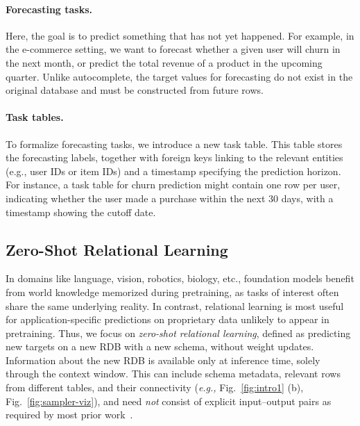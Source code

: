 \paragraph{Forecasting tasks.} Here, the goal is to predict something that has not yet happened. For example, in the e-commerce setting, we want to forecast whether a given user will churn in the next month, or predict the total revenue of a product in the upcoming quarter. Unlike autocomplete, the target values for forecasting do not exist in the original database and must be constructed from future rows.

\paragraph{Task tables.} To formalize forecasting tasks, we introduce a new task table. This table stores the forecasting labels, together with foreign keys linking to the relevant entities (e.g., user IDs or item IDs) and a timestamp specifying the prediction horizon. For instance, a task table for churn prediction might contain one row per user, indicating whether the user made a purchase within the next 30 days, with a timestamp showing the cutoff date. 




\subsection{Zero-Shot Relational Learning}


In domains like language, vision, robotics, biology, etc.,
foundation models benefit from world knowledge memorized during pretraining,
as tasks of interest often share the same underlying reality.
In contrast,
relational learning is most useful for
application-specific predictions on proprietary data
unlikely to appear in pretraining.
Thus, we focus on \textit{zero-shot relational learning},
defined as predicting new targets on a new RDB with a new schema,
without weight updates.
Information about the new RDB is available
only at inference time,
solely through the context window.
This can include schema metadata,
relevant rows from different tables,
and their connectivity
(\textit{e.g.,} Fig.~\ref{fig:intro1} (b),
Fig.~\ref{fig:sampler-viz}),
and need \textit{not} consist of explicit input--output pairs
as required by most prior work~\citep{kumorfm, tabpfn, tabpfnv2, huang2023prodigy}.


